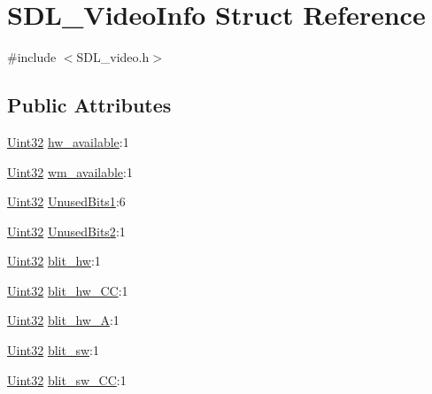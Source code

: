 \hypertarget{struct_s_d_l___video_info}{}\section{S\+D\+L\+\_\+\+Video\+Info Struct Reference}
\label{struct_s_d_l___video_info}


{\ttfamily \#include $<$S\+D\+L\+\_\+video.\+h$>$}

\subsection*{Public Attributes}
\begin{DoxyCompactItemize}
\item 
\hyperlink{_s_d_l__stdinc_8h_add440eff171ea5f55cb00c4a9ab8672d}{Uint32} \hyperlink{struct_s_d_l___video_info_a515e38f0a122a45fe67230e3929670f5}{hw\+\_\+available}\+:1
\item 
\hyperlink{_s_d_l__stdinc_8h_add440eff171ea5f55cb00c4a9ab8672d}{Uint32} \hyperlink{struct_s_d_l___video_info_aa7dee6b91b73acd0476d67d7036669e9}{wm\+\_\+available}\+:1
\item 
\hyperlink{_s_d_l__stdinc_8h_add440eff171ea5f55cb00c4a9ab8672d}{Uint32} \hyperlink{struct_s_d_l___video_info_a1aeb1f930953b9d32a56f978047b5f27}{Unused\+Bits1}\+:6
\item 
\hyperlink{_s_d_l__stdinc_8h_add440eff171ea5f55cb00c4a9ab8672d}{Uint32} \hyperlink{struct_s_d_l___video_info_add1b831a063c0a4aed3f2f496096374b}{Unused\+Bits2}\+:1
\item 
\hyperlink{_s_d_l__stdinc_8h_add440eff171ea5f55cb00c4a9ab8672d}{Uint32} \hyperlink{struct_s_d_l___video_info_afd985d7ee038d978694ebe0203338837}{blit\+\_\+hw}\+:1
\item 
\hyperlink{_s_d_l__stdinc_8h_add440eff171ea5f55cb00c4a9ab8672d}{Uint32} \hyperlink{struct_s_d_l___video_info_af62ba97a72e925000dde2ea27c854b7f}{blit\+\_\+hw\+\_\+\+C\+C}\+:1
\item 
\hyperlink{_s_d_l__stdinc_8h_add440eff171ea5f55cb00c4a9ab8672d}{Uint32} \hyperlink{struct_s_d_l___video_info_a2153563e63065ba5a66836ad03f0cd68}{blit\+\_\+hw\+\_\+\+A}\+:1
\item 
\hyperlink{_s_d_l__stdinc_8h_add440eff171ea5f55cb00c4a9ab8672d}{Uint32} \hyperlink{struct_s_d_l___video_info_aa7dc499b5b1bea4bdb4de04bd58fc796}{blit\+\_\+sw}\+:1
\item 
\hyperlink{_s_d_l__stdinc_8h_add440eff171ea5f55cb00c4a9ab8672d}{Uint32} \hyperlink{struct_s_d_l___video_info_aafaf9067d0b70d78ec9d58c32895b62e}{blit\+\_\+sw\+\_\+\+C\+C}\+:1

\end{DoxyCompactItemize}

